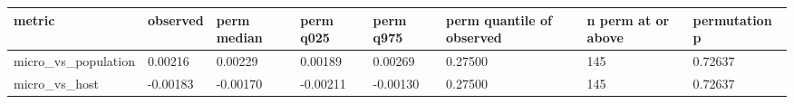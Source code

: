 {\footnotesize\setlength{\tabcolsep}{3pt}
\begin{longtable}{llllllll}
\toprule
\textbf{metric} & \textbf{observed} & \textbf{perm median} & \textbf{perm q025} & \textbf{perm q975} & \textbf{perm quantile of observed} & \textbf{n perm at or above} & \textbf{permutation p} \\
\midrule
\endhead
micro\_vs\_population & 0.00216 & 0.00229 & 0.00189 & 0.00269 & 0.27500 & 145 & 0.72637 \\
micro\_vs\_host & -0.00183 & -0.00170 & -0.00211 & -0.00130 & 0.27500 & 145 & 0.72637 \\
\bottomrule
\end{longtable}}
